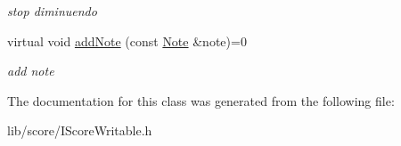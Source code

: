 \begin{DoxyCompactItemize}
\begin{DoxyCompactList}\small\item\em stop diminuendo \end{DoxyCompactList}\item 
\hypertarget{classsinsy_1_1IScoreWritable_a00cee3ee0ba767b1bda8a8a7e2ad63aa}{virtual void \hyperlink{classsinsy_1_1IScoreWritable_a00cee3ee0ba767b1bda8a8a7e2ad63aa}{add\-Note} (const \hyperlink{classsinsy_1_1Note}{\-Note} \&note)=0}\label{classsinsy_1_1IScoreWritable_a00cee3ee0ba767b1bda8a8a7e2ad63aa}

\begin{DoxyCompactList}\small\item\em add note \end{DoxyCompactList}\end{DoxyCompactItemize}


\-The documentation for this class was generated from the following file\-:\begin{DoxyCompactItemize}
\item 
lib/score/\-I\-Score\-Writable.\-h\end{DoxyCompactItemize}
